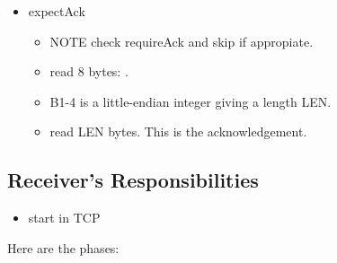 \begin{itemize}
  \item expectAck
    \begin{itemize}
    \item NOTE check requireAck and skip if appropiate.
    \item read 8 bytes: .
    \item B1-4 is a little-endian integer giving a length LEN.
    \item read LEN bytes.  This is the acknowledgement.
    \end{itemize}
\end{itemize}

\subsection{Receiver's Responsibilities}


\begin{itemize}
\item  start in TCP
\end{itemize}

Here are the phases:


